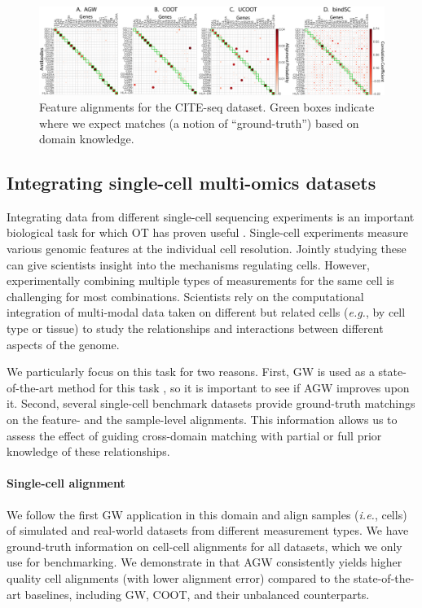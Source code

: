 \begin{figure}[t]
\centering
\includegraphics[width=\linewidth]{./Chapitre5/fig/cite_fgcoot_final.pdf}
\caption{\label{fig:cite} Feature alignments for the CITE-seq dataset. Green boxes indicate
where we expect matches (a notion of ``ground-truth'') based on domain knowledge.}
\label{}
\end{figure}

\subsection{Integrating single-cell multi-omics datasets}
Integrating data from different single-cell sequencing experiments is
an important biological task for which OT has proven useful \citep{Pamona,UniPort,Demetci20}.
Single-cell experiments measure various genomic features at the individual cell resolution.
Jointly studying these can give scientists insight into the mechanisms regulating cells.
However, experimentally combining multiple types of measurements for the same cell
is challenging for most combinations. Scientists rely on the computational integration
of multi-modal data taken on different but related cells (\textit{e.g.}, by cell type or tissue)
to study the relationships and interactions between different aspects of the genome.

We particularly focus on this task for two reasons. First, GW is used as a state-of-the-art
method for this task \citep{Pamona,Demetci22,UniPort}, so it is important to see if
AGW improves upon it. Second, several single-cell benchmark datasets provide
ground-truth matchings on the feature- and the sample-level alignments.
This information allows us to assess the effect of guiding cross-domain matching with partial
or full prior knowledge of these relationships.

\paragraph{Single-cell alignment} We follow the first GW application in this domain
\citep{Demetci20} and align samples (\textit{i.e.}, cells) of simulated and real-world datasets
from different measurement types. We have ground-truth information on cell-cell alignments
for all datasets, which we only use for benchmarking. We demonstrate in 
that AGW consistently yields higher quality cell alignments (with lower alignment error)
compared to the state-of-the-art baselines, including GW, COOT, and their unbalanced counterparts.

